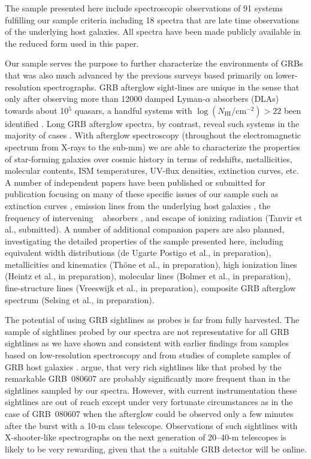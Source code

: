 \documentclass{aa}    %
\begin{document}
The sample presented here include spectroscopic observations of 91 systems
fulfilling our sample criteria including 18 spectra that are late time
observations of the underlying host galaxies. All spectra have been made
publicly available in the reduced form used in this paper.

Our sample serves the purpose to further characterize the environments of GRBs
that was also much advanced by the previous surveys based primarily on
lower-resolution spectrographs. GRB afterglow sight-lines are unique in the
sense that only after observing more than 12000 damped Lyman-$\alpha$ absorbers
(DLAs) towards about 10$^5$ quasars, a handful systems with
$\log({N_\mathrm{HI}/\mathrm{cm^{-2}}}) > 22$ been identified \citep[e.g., five
in][]{Noterdaeme2012b}. Long GRB afterglow spectra, by contrast, reveal such
systems in the majority of cases \citep[][and this work]{Jakobsson2006b,
	Fynbo2009, Cucchiara2015}. With afterglow spectroscopy (throughout the
electromagnetic spectrum from X-rays to the sub-mm) we are able to characterize
the properties of star-forming galaxies over cosmic history in terms of
redshifts, metallicities, molecular contents, ISM temperatures, UV-flux
densities, extinction curves, etc.  A number of independent papers have been
published or submitted for publication focusing on many of these specific issues
of our sample such as extinction curves \citep[][see also \citealt{Fynbo2014,
	Heintz2017}]{Japelj2015, Zafar17}, emission lines from the underlying host
galaxies \citep{Kruhler2015}, the frequency of intervening \mgii~ absorbers
\citep{Christensen2017}, and escape of ionizing radiation (Tanvir et al.,
submitted). A number of additional companion papers are also planned,
investigating the detailed properties of the sample presented here, including
equivalent width distributions (de Ugarte Postigo et al., in preparation),
metallicities and kinematics (Th{\"o}ne et al., in preparation), high ionization
lines (Heintz et al., in preparation), molecular lines (Bolmer et al., in
preparation), fine-structure lines (Vreeswijk et al., in preparation), composite
GRB afterglow spectrum (Selsing et al., in preparation).

The potential of using GRB sightlines as probes is far from fully harvested. The
sample of sightlines probed by our spectra are not representative for all GRB
sightlines as we have shown and consistent with earlier findings from samples
based on low-resolution spectroscopy \citep[e.g.,][]{Fynbo2009} and from studies
of complete samples of GRB host galaxies \citep{Hjorth2012, Covino2013,
	Perley2016}. \cite{Kruhler2013} argue, that very rich sightlines like that
probed by the remarkable GRB~080607 \citep{Prochaska2009} are probably
significantly more frequent than in the sightlines sampled by our spectra.
However, with current instrumentation these sightlines are out of reach except
under very fortunate circumstances as in the case of GRB~080607 when the
afterglow could be observed only a few minutes after the burst with a 10-m class
telescope. Observations of such sightlines with X-shooter-like spectrographs on
the next generation of 20--40-m telescopes is likely to be very rewarding, given
that the a suitable GRB detector will be online.
\end{document}
